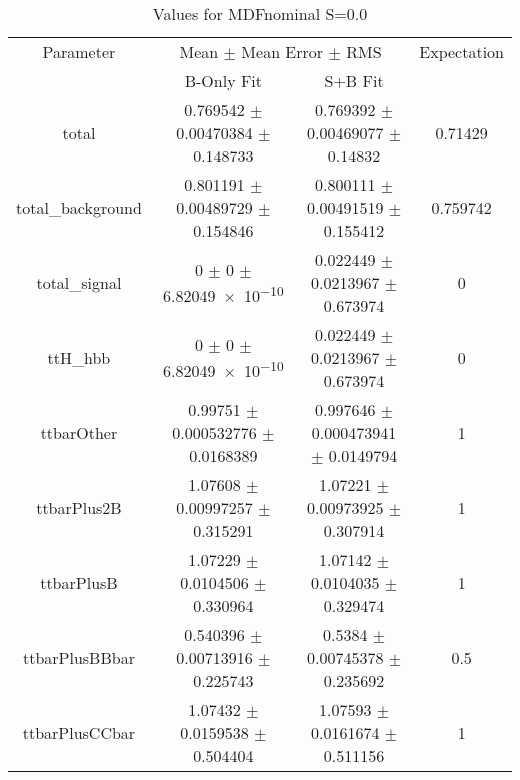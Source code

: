 \begin{table}
\centering
\caption{Values for MDFnominal S=0.0}
\begin{tabular}{cccc}
\toprule
Parameter & \multicolumn{2}{c}{Mean $\pm$ Mean Error $\pm$ RMS} & Expectation\\
 & B-Only Fit & S+B Fit & \\
\midrule
total & \num{0.769542} $\pm$ \num{0.00470384} $\pm$ \num{0.148733} & \num{0.769392} $\pm$ \num{0.00469077} $\pm$ \num{0.14832} & \num{0.71429}\\
total\_background & \num{0.801191} $\pm$ \num{0.00489729} $\pm$ \num{0.154846} & \num{0.800111} $\pm$ \num{0.00491519} $\pm$ \num{0.155412} & \num{0.759742}\\
total\_signal & \num{0} $\pm$ \num{0} $\pm$ \num{6.82049e-10} & \num{0.022449} $\pm$ \num{0.0213967} $\pm$ \num{0.673974} & \num{0}\\
ttH\_hbb & \num{0} $\pm$ \num{0} $\pm$ \num{6.82049e-10} & \num{0.022449} $\pm$ \num{0.0213967} $\pm$ \num{0.673974} & \num{0}\\
ttbarOther & \num{0.99751} $\pm$ \num{0.000532776} $\pm$ \num{0.0168389} & \num{0.997646} $\pm$ \num{0.000473941} $\pm$ \num{0.0149794} & \num{1}\\
ttbarPlus2B & \num{1.07608} $\pm$ \num{0.00997257} $\pm$ \num{0.315291} & \num{1.07221} $\pm$ \num{0.00973925} $\pm$ \num{0.307914} & \num{1}\\
ttbarPlusB & \num{1.07229} $\pm$ \num{0.0104506} $\pm$ \num{0.330964} & \num{1.07142} $\pm$ \num{0.0104035} $\pm$ \num{0.329474} & \num{1}\\
ttbarPlusBBbar & \num{0.540396} $\pm$ \num{0.00713916} $\pm$ \num{0.225743} & \num{0.5384} $\pm$ \num{0.00745378} $\pm$ \num{0.235692} & \num{0.5}\\
ttbarPlusCCbar & \num{1.07432} $\pm$ \num{0.0159538} $\pm$ \num{0.504404} & \num{1.07593} $\pm$ \num{0.0161674} $\pm$ \num{0.511156} & \num{1}\\
\bottomrule
\end{tabular}
\end{table}